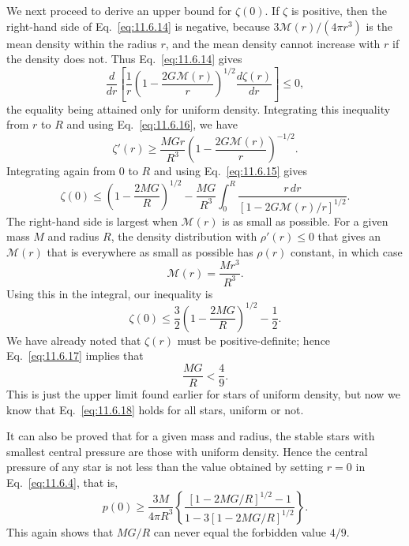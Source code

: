 We next proceed to derive an upper bound for \(\zeta(0)\). If \(\zeta\) is
positive, then the right-hand side of Eq.~\eqref{eq:11.6.14} is negative,
because \(3\mathcal{M}(r)/(4\pi r^3)\) is the mean density within the radius
\(r\), and the mean density cannot increase with \(r\) if the density does
not. Thus Eq.~\eqref{eq:11.6.14} gives
\[
  \frac{d}{dr}
  \left[
    \frac1r
    \left(1-\frac{2G\mathcal{M}(r)}r\right)^{1/2}
    \frac{d\zeta(r)}{dr}
  \right]
  \le0,
\]
the equality being attained only for uniform density. Integrating this
inequality from \(r\) to \(R\) and using Eq.~\eqref{eq:11.6.16}, we have
\[
  \zeta'(r)
  \ge
  \frac{MGr}{R^3}
  \left(1-\frac{2G\mathcal{M}(r)}r\right)^{-1/2}.
\]
Integrating again from \(0\) to \(R\) and using
Eq.~\eqref{eq:11.6.15} gives
\[
  \zeta(0)
  \le
  \left(1-\frac{2MG}{R}\right)^{1/2}
  -\frac{MG}{R^3}
  \int_0^R
  \frac{r\,dr}
  {[1-2G\mathcal{M}(r)/r]^{1/2}}.
\]
The right-hand side is largest when \(\mathcal{M}(r)\) is as small as
possible. For a given mass \(M\) and radius \(R\), the density distribution
with \(\rho'(r)\le0\) that gives an \(\mathcal{M}(r)\) that is everywhere as
small as possible has \(\rho(r)\) constant, in which case
\[
  \mathcal{M}(r)=\frac{Mr^3}{R^3}.
\]
Using this in the integral, our inequality is
\begin{equation}
  \zeta(0)
  \le
  \frac32\left(1-\frac{2MG}{R}\right)^{1/2}-\frac12.
  \tag{11.6.17}\label{eq:11.6.17}
\end{equation}
We have already noted that \(\zeta(r)\) must be positive-definite; hence
Eq.~\eqref{eq:11.6.17} implies that
\begin{equation}
  \frac{MG}{R}<\frac49.
  \tag{11.6.18}\label{eq:11.6.18}
\end{equation}
This is just the upper limit found earlier for stars of uniform density, but
now we know that Eq.~\eqref{eq:11.6.18} holds for all stars, uniform or not.

It can also be proved that for a given mass and radius, the stable stars with
smallest central pressure are those with uniform density. Hence the central
pressure of any star is not less than the value obtained by setting \(r=0\)
in Eq.~\eqref{eq:11.6.4}, that is,
\begin{equation}
  p(0)
  \ge
  \frac{3M}{4\pi R^3}
  \left\{
    \frac{[1-2MG/R]^{1/2}-1}
    {1-3[1-2MG/R]^{1/2}}
  \right\}.
  \tag{11.6.19}\label{eq:11.6.19}
\end{equation}
This again shows that \(MG/R\) can never equal the forbidden value \(4/9\).

